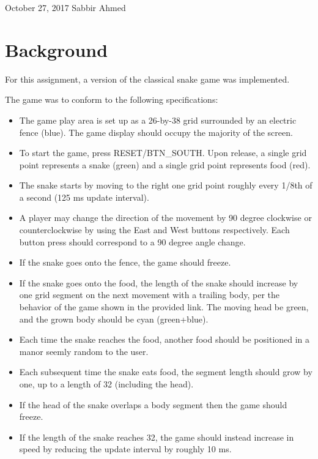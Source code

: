 \documentclass[paper=usletter, fontsize=12pt]{article}
\begin{document}
     {October 27, 2017}
    {Sabbir Ahmed}
    \vspace{-0.1in}

    \section{Background} For this assignment, a version of the classical snake
    game was implemented.

    The game was to conform to the following specifications:

    \begin{itemize}

        \item The game play area is set up as a 26-by-38 grid surrounded by an
        electric fence (blue). The game display should occupy the majority of
        the screen.

        \item To start the game, press RESET/BTN\_SOUTH. Upon release, a single
        grid point represents a snake (green) and a single grid point
        represents food (red).

        \item The snake starts by moving to the right one grid point roughly
        every 1/8th of a second (125 ms update interval).

        \item A player may change the direction of the movement by 90 degree
        clockwise or counterclockwise by using the East and West buttons
        respectively. Each button press should correspond to a 90 degree angle
        change.

        \item If the snake goes onto the fence, the game should freeze.

        \item If the snake goes onto the food, the length of the snake should
        increase by one grid segment on the next movement with a trailing body,
        per the behavior of the game shown in the provided link. The moving
        head be green, and the grown body should be cyan (green+blue).

        \item Each time the snake reaches the food, another food should be
        positioned in a manor seemly random to the user.

        \item Each subsequent time the snake eats food, the segment length
        should grow by one, up to a length of 32 (including the head).

        \item If the head of the snake overlaps a body segment then the game
        should freeze.

        \item If the length of the snake reaches 32, the game should instead
        increase in speed by reducing the update interval by roughly 10 ms.

    \end{itemize}
\end{document}
